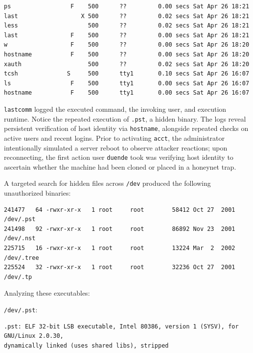 \begin{lstlisting}[style=terminal]
ps                 F    500      ??         0.00 secs Sat Apr 26 18:21
last                  X 500      ??         0.02 secs Sat Apr 26 18:21
less                    500      ??         0.02 secs Sat Apr 26 18:21
last               F    500      ??         0.00 secs Sat Apr 26 18:21
w                  F    500      ??         0.00 secs Sat Apr 26 18:20
hostname           F    500      ??         0.00 secs Sat Apr 26 18:20
xauth                   500      ??         0.02 secs Sat Apr 26 18:20
tcsh              S     500      tty1       0.10 secs Sat Apr 26 16:07
ls                 F    500      tty1       0.00 secs Sat Apr 26 16:07
hostname           F    500      tty1       0.00 secs Sat Apr 26 16:07
\end{lstlisting}

\vspace{1em}

\texttt{lastcomm} logged the executed command, the invoking user, and execution runtime. Notice the repeated execution of \texttt{.pst}, a hidden binary. The logs reveal persistent verification of host identity via \texttt{hostname}, alongside repeated checks on active users and recent logins. Prior to activating \texttt{acct}, the administrator intentionally simulated a server reboot to observe attacker reactions; upon reconnecting, the first action user \texttt{duende} took was verifying host identity to ascertain whether the machine had been cloned or placed in a honeynet trap.

A targeted search for hidden files across \texttt{/dev} produced the following unauthorized binaries:

\vspace{1em}

\begin{lstlisting}[style=terminal]
241477   64 -rwxr-xr-x   1 root     root        58412 Oct 27  2001 /dev/.pst
241498   92 -rwxr-xr-x   1 root     root        86892 Nov 23  2001 /dev/.nst
225715   16 -rwxr-xr-x   1 root     root        13224 Mar  2  2002 /dev/.tree
225524   32 -rwxr-xr-x   1 root     root        32236 Oct 27  2001 /dev/.tp
\end{lstlisting}

\vspace{1em}

Analyzing these executables:

\texttt{/dev/.pst}:

\vspace{1em}

\begin{lstlisting}[style=terminal]
.pst: ELF 32-bit LSB executable, Intel 80386, version 1 (SYSV), for GNU/Linux 2.0.30, 
dynamically linked (uses shared libs), stripped
\end{lstlisting}

